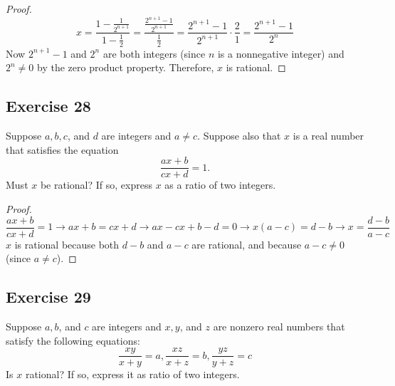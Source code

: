 \documentclass[14pt]{extarticle}
\newcommand{\dps}{\displaystyle}
\begin{document}
\begin{proof}
\[
x = \frac{1-\dps\frac{1}{2^{n+1}}}{1-\dps\frac{1}{2}} =
\frac{\dps\frac{2^{n+1}-1}{2^{n+1}}}{\dps\frac{1}{2}} =
\dps\frac{2^{n+1}-1}{2^{n+1}}\cdot{\dps\frac{2}{1}} = 
\dps\frac{2^{n+1}-1}{2^{n}}
\]
Now $2^{n+1} - 1$ and $2^n$ are both integers (since $n$ is a nonnegative integer) and $2^n \neq 0$ by the zero product
property. Therefore, $x$ is rational.
\end{proof}

\subsection{Exercise 28}
Suppose $a, b, c$, and $d$ are integers and $a \neq c$. Suppose also that $x$ is a real number that satisfies the
equation
\[
\frac{ax+b}{cx+d} = 1.
\]
Must $x$ be rational? If so, express $x$ as a ratio of two integers.

\begin{proof}
\[
\frac{ax+b}{cx+d} = 1 \to ax+b = cx+d \to ax-cx+b-d = 0 \to x(a-c) = d-b \to x = \frac{d-b}{a-c}
\]
$x$ is rational because both $d-b$ and $a-c$ are rational, and because $a-c \neq 0$ (since $a \neq c$).
\end{proof}

\subsection{Exercise 29}
Suppose $a, b$, and $c$ are integers and $x, y$, and $z$ are nonzero real numbers that satisfy the following equations:
\[
\frac{xy}{x+y} = a, \frac{xz}{x+z} = b, \frac{yz}{y+z} = c
\]
Is $x$ rational? If so, express it as ratio of two integers.
\end{document}
